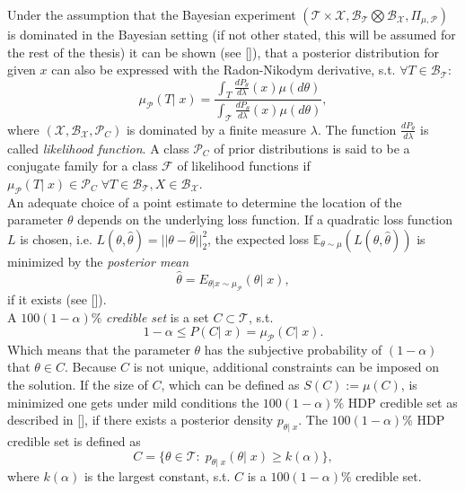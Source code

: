 \documentclass[12pt,letterpaper]{article}
\numberwithin{equation}{subsection}
\begin{document}
Under the assumption that the Bayesian experiment $(\mathcal{T}\times\mathcal{X},  \mathcal{B}_\mathcal{T}\bigotimes\mathcal{B}_\mathcal{X}, \Pi_{\mu,\mathcal{P}})$ is dominated in the Bayesian setting (if not other stated, this will be assumed for the rest of the thesis) it can be shown (see [\cite{interbayes}]), that a posterior distribution for given $x$ can also be expressed with the Radon-Nikodym derivative, s.t. $\forall T \in \mathcal{B}_\mathcal{T}:$
\begin{equation}
\label{eq:dpost}
 \mu_\mathcal{P}(T|\; x) = \frac{\int_T \frac{dP_\theta}{d\lambda}(x)\mu(d\theta)}{\int_\mathcal{T} \frac{dP_\theta}{d\lambda}(x)\mu(d\theta)},
\end{equation} 
where $(\mathcal{X}, \mathcal{B}_\mathcal{X}, \mathcal{P}_C)$ is dominated by a finite measure $\lambda$. The function $\frac{dP_\theta}{d\lambda}$ is called \textit{likelihood function}. A class $\mathcal{P}_C$ of prior distributions is said to be a conjugate family for a class $\mathcal{F}$ of likelihood functions if  $\mu_\mathcal{P}(T|\; x) \in \mathcal{P}_C \; \forall T \in \mathcal{B}_\mathcal{T},  X \in \mathcal{B}_\mathcal{X}$.
\\An adequate choice of a point estimate to determine the location of the parameter $\theta$ depends on the underlying loss function. If a quadratic loss function $L$ is chosen, i.e. $L(\theta, \hat{\theta}) = ||\theta - \hat{\theta}||_2^2$, the expected loss $\mathbb{E}_{\theta \sim \mu} (L(\theta, \hat{\theta}))$ is minimized by the \textit{posterior mean} 
\begin{equation}
\label{eq:pmean}
	\hat{\theta} = E_{\theta |x \sim \mu_\mathcal{P}}(\theta |\; x),
\end{equation}
 if it exists (see [\cite{statdec}]). 
\\ A $100(1-\alpha)\%$ \textit{credible set} is a set $C \subset \mathcal{T}$, s.t.
\begin{equation}
1 - \alpha \leq P(C| \;x ) = \mu_\mathcal{P}(C|\; x).
\end{equation}
Which means that the parameter $\theta$ has the subjective probability of $(1-\alpha)$ that $\theta \in C$.
Because $C$ is not unique, additional constraints can be imposed on the solution. If the size of $C$, which can be defined as  $S(C) := \mu(C)$, is minimized one gets under mild conditions the  $100(1-\alpha)\%$  HDP credible set  as described in [\cite{statdec}], if there exists a posterior density $p_{\theta|\;x}$.
The  $100(1-\alpha)\%$ HDP credible set is defined as  
\begin{equation}
\label{eq:hdp}
C = \{\theta \in \mathcal{T}: \; p_{\theta|\;x}(\theta|\; x) \geq k(\alpha)\},
\end{equation}
where $k(\alpha)$ is the largest constant, s.t. $C$ is a $100(1-\alpha)\%$ credible set.
\newpage
\end{document}
